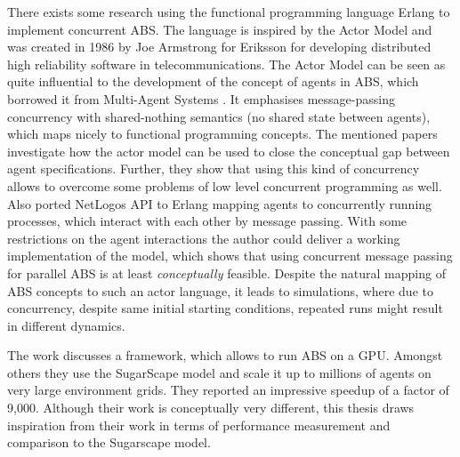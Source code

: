 There exists some research \cite{di_stefano_using_2005, sher_agent-based_2013, varela_modelling_2004} using the functional programming language Erlang \cite{armstrong_erlang_2010} to implement concurrent ABS. The language is inspired by the Actor Model \cite{agha_actors:_1986} and was created in 1986 by Joe Armstrong for Eriksson for developing distributed high reliability software in telecommunications. The Actor Model can be seen as quite influential to the development of the concept of agents in ABS, which borrowed it from Multi-Agent Systems \cite{wooldridge_introduction_2009}. It emphasises message-passing concurrency with shared-nothing semantics (no shared state between agents), which maps nicely to functional programming concepts. The mentioned papers investigate how the actor model can be used to close the conceptual gap between agent specifications. Further, they show that using this kind of concurrency allows to overcome some problems of low level concurrent programming as well.
Also \cite{bezirgiannis_improving_2013} ported NetLogos API to Erlang mapping agents to concurrently running processes, which interact with each other by message passing. With some restrictions on the agent interactions the author could deliver a working implementation of the model, which shows that using concurrent message passing for parallel ABS is at least \textit{conceptually} feasible. Despite the natural mapping of ABS concepts to such an actor language, it leads to simulations, where due to concurrency, despite same initial starting conditions, repeated runs might result in different dynamics.

The work \cite{lysenko_framework_2008} discusses a framework, which allows to run ABS on a GPU. Amongst others they use the SugarScape model \cite{epstein_growing_1996} and scale it up to millions of agents on very large environment grids. They reported an impressive speedup of a factor of 9,000. Although their work is conceptually very different, this thesis draws inspiration from their work in terms of performance measurement and comparison to the Sugarscape model.


